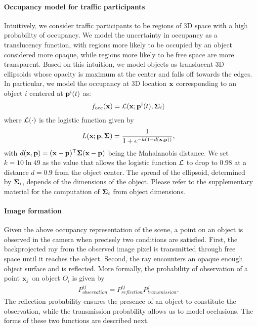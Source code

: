\paragraph{Occupancy model for traffic participants}
Intuitively, we consider traffic participants to be regions of 3D space with a high probability of occupancy. We model the uncertainty in occupancy as a translucency function, with regions more likely to be occupied by an object considered more opaque, while regions more likely to be free space are more transparent. Based on this intuition, we model objects as translucent 3D ellipsoids whose opacity is maximum at the center and falls off towards the edges. In particular, we model the occupancy at 3D location $\mathbf{x}$ corresponding to an object $i$ centered at $\mathbf{p}^{i}({t})$ as:
\begin{align}
  f_{\text{occ}}(\mathbf{x}) = \mathcal{L}(\mathbf{x}; \mathbf{p}^{i}({t}), \bm{\Sigma}_i)
\end{align}
where $\mathcal{L}(\cdot)$ is the logistic function given by
\begin{align}
  L(\mathbf{x}; \mathbf{p}, \bm{\Sigma}) = \frac{1}{1 + e^{-k(1 - d(\mathbf{x},\mathbf{p}))}},
\end{align}
with $d(\mathbf{x}, \mathbf{p}) = (\mathbf{x}-\mathbf{p})^\top\bm{\Sigma}(\mathbf{x}-\mathbf{p})$ being the Mahalanobis distance. We set $k = 10\ln{49}$ as the value that allows the logistic function $\mathcal{L}$ to drop to $0.98$ at a distance $d = 0.9$ from the object center. The spread of the ellipsoid, determined by $\bm{\Sigma}_i$, depends of the dimensions of the object. Please refer to the supplementary material for the computation of $\bm{\Sigma}_i$ from object dimensions.


\paragraph{Image formation}
Given the above occupancy representation of the scene, a point on an object is observed in the camera when precisely two conditions are satisfied. First, the backprojected ray from the observed image pixel is transmitted through free space until it reaches the object. Second, the ray encounters an opaque enough object surface and is reflected. More formally, the probability of observation of a point $\mathbf{x}_j$ on object $O_i$ is given by
\begin{align}
P^{ij}_{\textit{observation}} = P^{ij}_{\textit{reflection}}P^{j}_{\textit{transmission}}.
\label{eq:imgform}
\end{align}
The reflection probability ensures the presence of an object to constitute the observation, while the transmission probability allows us to model occlusions. The forms of these two functions are described next.


